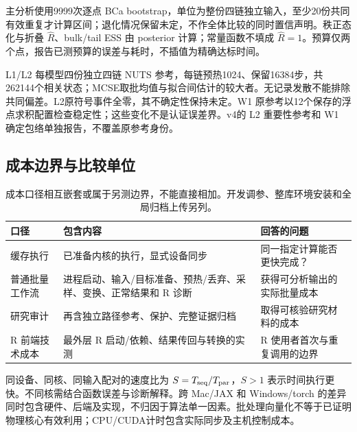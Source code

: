 主分析使用9999次逐点 BCa bootstrap，单位为整份四链独立输入，至少20份共同有效重复才计算区间；退化情况保留未定，不作全体比较的同时置信声明。秩正态化与折叠 $\hat R$、bulk/tail ESS 由 posterior 计算\cite{vehtari,posterior}；常量函数不填成 $\hat R=1$。预算仅两个点，报告已测预算的误差与耗时，不插值为精确达标时间。

L1/L2 每模型四份独立四链 NUTS 参考，每链预热1024、保留16384步，共262144个相关状态；MCSE取批均值与拟合间估计的较大者。无记录发散不能排除共同偏差。L2原符号事件全零，其不确定性保持未定。W1 原参考以12个保存的浮点求积配置检查稳定性；这些变化不是认证误差界。v4的 L2 重要性参考和 W1 确定包络单独报告，不覆盖原参考身份。

\subsection{成本边界与比较单位}
\begin{table}[htbp]\centering\smalltable
\begin{tabularx}{\linewidth}{l Y Y}\toprule
口径 & 包含内容 & 回答的问题\\\midrule
缓存执行 & 已准备内核的执行，显式设备同步 & 同一指定计算能否更快完成？\\
普通批量工作流 & 进程启动、输入/目标准备、预热/丢弃、采样、变换、正常结果和 R 诊断 & 获得可分析输出的实际批量成本\\
研究审计 & 再含独立路径参考、保护、完整证据归档 & 取得可核验研究材料的成本\\
R 前端技术成本 & 最外层 R 启动/依赖、结果传回与转换的实测 & R 使用者首次与重复调用的边界\\\bottomrule
\end{tabularx}
\caption{成本口径相互嵌套或属于另测边界，不能直接相加。开发调参、整库环境安装和全局归档上传另列。}
\end{table}

同设备、同核、同输入配对的速度比为 $S=T_{\rm seq}/T_{\rm par}$，$S>1$ 表示时间执行更快。不同核需结合函数误差与诊断解释。跨 Mac/JAX 和 Windows/torch 的差异同时包含硬件、后端及实现，不归因于算法单一因素。批处理向量化不等于已证明物理核心有效利用；CPU/CUDA计时包含实际同步及主机控制成本。
